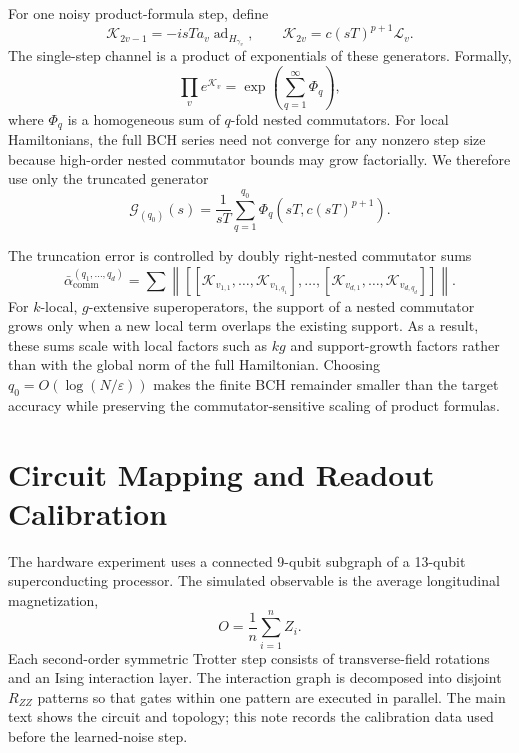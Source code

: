 \documentclass[11pt]{article}
\newcommand{\eps}{\varepsilon}
\newcommand{\Lind}{\mathcal{L}}
\newcommand{\ad}{\operatorname{ad}}
\newcommand{\comm}{\operatorname{comm}}
\begin{document}
For one noisy product-formula step, define
\begin{equation}
    \mathcal{K}_{2v-1}=-i sT a_v \ad_{H_{\gamma_v}},
    \qquad
    \mathcal{K}_{2v}=c(sT)^{p+1}\Lind_v .
\end{equation}
The single-step channel is a product of exponentials of these generators. Formally,
\begin{equation}
    \prod_v e^{\mathcal{K}_v}
    =
    \exp\left(\sum_{q=1}^{\infty}\Phi_q\right),
\end{equation}
where $\Phi_q$ is a homogeneous sum of $q$-fold nested commutators. For local Hamiltonians, the full BCH series need not converge for any nonzero step size because high-order nested commutator bounds may grow factorially. We therefore use only the truncated generator
\begin{equation}
    \mathcal{G}_{(q_0)}(s)=\frac{1}{sT}\sum_{q=1}^{q_0}\Phi_q(sT,c(sT)^{p+1}).
\end{equation}

The truncation error is controlled by doubly right-nested commutator sums
\begin{equation}
    \bar{\alpha}_{\comm}^{(q_1,\ldots,q_d)}
    =
    \sum
    \left\|
    \left[
      [\mathcal{K}_{v_{1,1}},\ldots,\mathcal{K}_{v_{1,q_1}}],
      \ldots,
      [\mathcal{K}_{v_{d,1}},\ldots,\mathcal{K}_{v_{d,q_d}}]
    \right]
    \right\|.
\end{equation}
For $k$-local, $g$-extensive superoperators, the support of a nested commutator grows only when a new local term overlaps the existing support. As a result, these sums scale with local factors such as $kg$ and support-growth factors rather than with the global norm of the full Hamiltonian. Choosing $q_0=O(\log(N/\eps))$ makes the finite BCH remainder smaller than the target accuracy while preserving the commutator-sensitive scaling of product formulas.

\section{Circuit Mapping and Readout Calibration}

The hardware experiment uses a connected 9-qubit subgraph of a 13-qubit superconducting processor. The simulated observable is the average longitudinal magnetization,
\begin{equation}
    O=\frac{1}{n}\sum_{i=1}^{n} Z_i .
\end{equation}
Each second-order symmetric Trotter step consists of transverse-field rotations and an Ising interaction layer. The interaction graph is decomposed into disjoint $R_{ZZ}$ patterns so that gates within one pattern are executed in parallel. The main text shows the circuit and topology; this note records the calibration data used before the learned-noise step.
\end{document}

